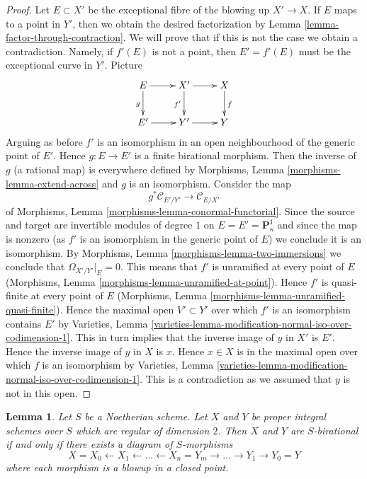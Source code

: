 \documentclass{stacks-project}
\theoremstyle{plain}
\newtheorem{lemma}[subsection]{Lemma}
\theoremstyle{definition}
\theoremstyle{remark}
\numberwithin{equation}{subsection}
\begin{document}
\begin{proof}
\medskip\noindent
Let $E \subset X'$ be the exceptional fibre of the blowing up
$X' \to X$. If $E$ maps to a point in $Y'$, then we obtain the
desired factorization by Lemma \ref{lemma-factor-through-contraction}.
We will prove that
if this is not the case we obtain a contradiction. Namely,
if $f'(E)$ is not a point, then
$E' = f'(E)$ must be the exceptional curve in $Y'$.
Picture
$$
\xymatrix{
E \ar[r] \ar[d]_g & X' \ar[d]_{f'} \ar[r] & X \ar[d]^f \\
E' \ar[r] & Y' \ar[r] & Y
}
$$
Arguing as before $f'$ is an isomorphism in an open neighbourhood
of the generic point of $E'$. Hence $g : E \to E'$ is a finite birational
morphism. Then the inverse of $g$ (a rational map) is everywhere defined
by Morphisms, Lemma \ref{morphisms-lemma-extend-across} and $g$ is
an isomorphism. Consider the map
$$
g^*\mathcal{C}_{E'/Y'} \longrightarrow \mathcal{C}_{E/X'}
$$
of Morphisms, Lemma \ref{morphisms-lemma-conormal-functorial}.
Since the source and target are invertible modules of degree $1$
on $E = E' = \mathbf{P}^1_\kappa$ and since the map is
nonzero (as $f'$ is an isomorphism in the generic point of $E$)
we conclude it is an isomorphism. By
Morphisms, Lemma \ref{morphisms-lemma-two-immersions}
we conclude that $\Omega_{X'/Y'}|_E = 0$.
This means that $f'$ is unramified at every point of $E$
(Morphisms, Lemma \ref{morphisms-lemma-unramified-at-point}).
Hence $f'$ is quasi-finite at every point of $E$
(Morphisms, Lemma \ref{morphisms-lemma-unramified-quasi-finite}).
Hence the maximal open $V' \subset Y'$ over which $f'$ is an
isomorphism contains $E'$ by Varieties, Lemma
\ref{varieties-lemma-modification-normal-iso-over-codimension-1}.
This in turn implies that the inverse image of $y$ in
$X'$ is $E'$. Hence the inverse image of $y$ in $X$ is $x$.
Hence $x \in X$ is in the maximal open over which
$f$ is an isomorphism by Varieties, Lemma
\ref{varieties-lemma-modification-normal-iso-over-codimension-1}.
This is a contradiction as we assumed that $y$ is not
in this open.
\end{proof}

\begin{lemma}
\label{lemma-birational-regular-surfaces}
Let $S$ be a Noetherian scheme. Let $X$ and $Y$ be proper
integral schemes over $S$ which are regular of dimension $2$.
Then $X$ and $Y$ are $S$-birational if and only if there
exists a diagram of $S$-morphisms
$$
X = X_0 \leftarrow X_1 \leftarrow \ldots \leftarrow X_n = Y_m
\to \ldots \to Y_1 \to Y_0 = Y
$$
where each morphism is a blowup in a closed point.
\end{lemma}
\end{document}

